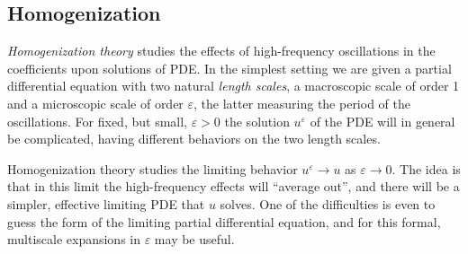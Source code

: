 \subsection{Homogenization}
\label{sec:homogenization}

\textit{Homogenization theory} studies the effects of high-frequency oscillations in the coefficients upon solutions of PDE. In the simplest setting we are given a partial differential equation with two natural \textit{length scales}, a macroscopic scale of order 1 and a microscopic scale of order $\varepsilon$, the latter measuring the period of the oscillations. For fixed, but small, $\varepsilon > 0$ the solution $u^\varepsilon$ of the PDE will in general be complicated, having different behaviors on the two length scales.

Homogenization theory studies the limiting behavior $u^\varepsilon \to u$ as $\varepsilon \to 0$. The idea is that in this limit the high-frequency effects will ``average out'', and there will be a simpler, effective limiting PDE that $u$ solves. One of the difficulties is even to guess the form of the limiting partial differential equation, and for this formal, multiscale expansions in $\varepsilon$ may be useful.

